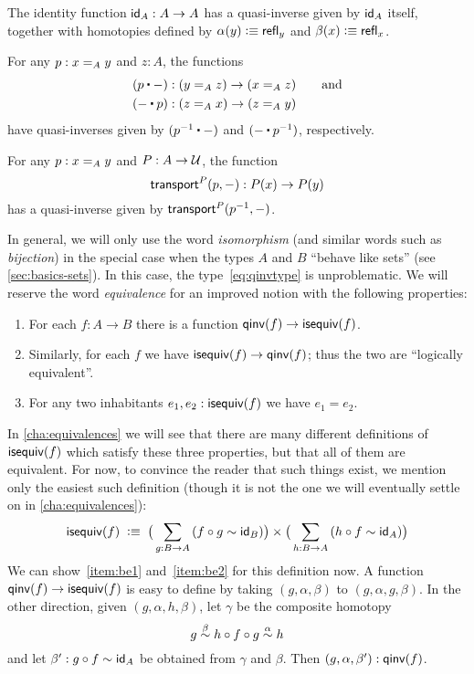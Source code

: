\begin{eg}\label{eg:idequiv}
  The identity function $\idfunc[A]:A\to A$ has a quasi-inverse given by $\idfunc[A]$ itself, together with homotopies defined by $\alpha(y) \defeq \refl{y}$ and $\beta(x) \defeq \refl{x}$.
\end{eg}

\begin{eg}\label{eg:concatequiv}
  For any $p:\id[A]xy$ and $z:A$, the functions
  \begin{align*}
    (p\ct {-})&:(\id[A]yz) \to (\id[A]xz) \qquad\text{and}\\
    ({-} \ct p)&:(\id[A]zx) \to (\id[A]zy)
  \end{align*}
  have quasi-inverses given by $(\opp p \ct {-})$ and $({-} \ct \opp p)$, respectively.
\end{eg}

\begin{eg}\label{thm:transportequiv}
  For any $p:\id[A]xy$ and $P:A\to\type$, the function
  \[\transfib{P}{p}{-}:P(x) \to P(y)\]
  has a quasi-inverse given by $\transfib{P}{\opp p}{-}$.
\end{eg}

In general, we will only use the word \emph{isomorphism} (and similar words such as \emph{bijection}) in the special case when the types $A$ and $B$ ``behave like sets'' (see \autoref{sec:basics-sets}).
In this case, the type~\eqref{eq:qinvtype} is unproblematic.
We will reserve the word \emph{equivalence} for an improved notion with the following properties:%
\begin{enumerate}
\item For each $f:A\to B$ there is a function $\qinv(f) \to \isequiv (f)$.\label{item:be1}
\item Similarly, for each $f$ we have $\isequiv (f) \to \qinv(f)$; thus the two are ``logically equivalent''.\label{item:be2}
\item For any two inhabitants $e_1,e_2:\isequiv(f)$ we have $e_1=e_2$.\label{item:be3}
\end{enumerate}
In \autoref{cha:equivalences} we will see that there are many different definitions of $\isequiv(f)$ which satisfy these three properties, but that all of them are equivalent.
For now, to convince the reader that such things exist, we mention only the easiest such definition (though it is not the one we will eventually settle on in \autoref{cha:equivalences}):
\begin{equation}\label{eq:isequiv-invertible}
  \isequiv(f) \;\defeq\;
  \big(\sm{g:B\to A} (f\circ g \htpy \idfunc[B])\big)
  \times
  \big(\sm{h:B\to A} (h\circ f \htpy \idfunc[A])\big)
\end{equation}
We can show~\ref{item:be1} and~\ref{item:be2} for this definition now.
A function $\qinv(f) \to \isequiv (f)$ is easy to define by taking $(g,\alpha,\beta)$ to $(g,\alpha,g,\beta)$.
In the other direction, given $(g,\alpha,h,\beta)$, let $\gamma$ be the composite homotopy
\[ g \overset{\beta}{\htpy} h\circ f\circ g \overset{\alpha}{\htpy} h \]
and let $\beta':g\circ f\htpy \idfunc[A]$ be obtained from $\gamma$ and $\beta$.
Then $(g,\alpha,\beta'):\qinv(f)$.

